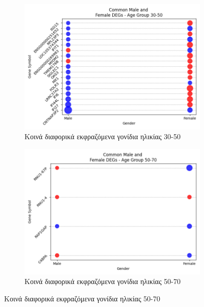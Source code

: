 \documentclass[12pt]{report}
\begin{document}
                    \begin{figure}[ht]
                        \centering
                        \begin{subfigure}[b]{0.48\textwidth}
                            \includegraphics[width=\textwidth]{Chapter-3/bubbleplot_combined_30-50.png}
                            \caption{Κοινά διαφορικά εκφραζόμενα γονίδια ηλικίας 30-50}
                            \label{fig:bubbleplot_combined_30-50}
                        \end{subfigure}
                        \hfill %
                        \begin{subfigure}[b]{0.48\textwidth}
                            \includegraphics[width=\textwidth]{Chapter-3/bubbleplot_combined_50-70.png}
                            \caption{Κοινά διαφορικά εκφραζόμενα γονίδια ηλικίας 50-70}
                            \label{fig:bubbleplot_combined_50-70}
                        \end{subfigure}
                        

\end{figure}
\end{document}
